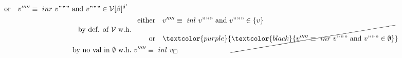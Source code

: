\documentclass{article}
\begin{document}
\begin{align*}
\begin{array}{rl}
    \text{or} & v'''''\equiv \inr v""" \AND v"""\in\V[\beta]^{\delta'}\end{array} \\
        \text{by def. of $\V$ w.h.}  &\ \begin{array}{rl}\text{either}&v'''''\equiv \inl v""" \AND v"""\in \{v\} \\
        \text{or} & \textcolor{purple}{\cancel{\textcolor{black}{v'''''\equiv \inr v""" \AND v"""\in \emptyset}}}\end{array} \\
            \text{by no val in $\emptyset$ w.h.} &\ v'''''\equiv \inl v _\square\\
        \end{align*}
\end{document}
